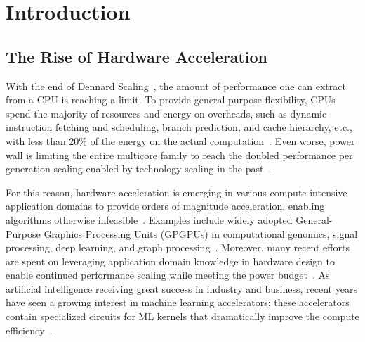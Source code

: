 \chapter{Introduction}

\section{The Rise of Hardware Acceleration}

With the end of Dennard Scaling~\cite{dennard}, the amount of performance one can extract from a CPU is reaching a limit.
To provide general-purpose flexibility, CPUs spend the majority of resources and energy on overheads,
such as dynamic instruction fetching and scheduling, branch prediction, and cache hierarchy, etc.,
with less than 20\% of
the energy on the actual computation~\cite{mark}.
Even worse, power wall is limiting the entire multicore family
to reach the doubled performance per generation scaling enabled by technology scaling in the
past~\cite{multicorescale}.

For this reason, hardware acceleration is emerging in various compute-intensive application domains
to provide orders of magnitude acceleration, enabling algorithms otherwise
infeasible~\cite{genomicaccel, bioaccel, fpgadeeplearn, fpgacripto}.
Examples include widely adopted General-Purpose Graphics Processing Units (GPGPUs)
in computational genomics, signal processing,
deep learning, and graph processing~\cite{fpgacloudsurvey,bioaccel,genomicaccel}.
Moreover, many recent efforts are spent on leveraging application domain knowledge in hardware design to enable
continued performance scaling while meeting the power budget~\cite{turinglecture}.
As artificial intelligence receiving great success in industry and business,
recent years have seen a growing interest in machine learning accelerators;
these accelerators contain specialized circuits for ML kernels that dramatically improve the compute
efficiency~\cite{dadiannao,tpu,eie,chen2017eyeriss,tangram,truenorth}.

